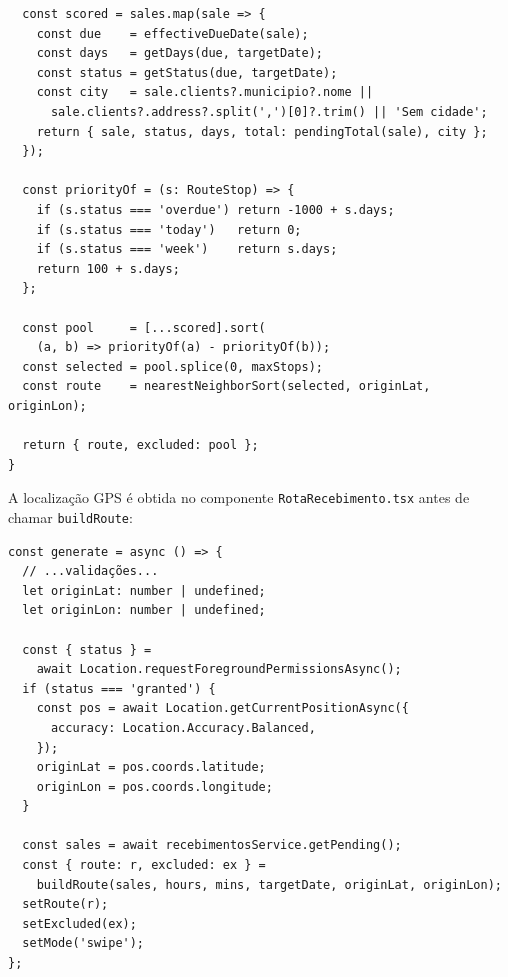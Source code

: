 \documentclass[
	12pt,				%
	oneside,			%
	a4paper,			%
	english,			%
	brazil				%
	]{abntex2}
\begin{document}
\begin{apendicesenv}
\begin{verbatim}
  const scored = sales.map(sale => {
    const due    = effectiveDueDate(sale);
    const days   = getDays(due, targetDate);
    const status = getStatus(due, targetDate);
    const city   = sale.clients?.municipio?.nome ||
      sale.clients?.address?.split(',')[0]?.trim() || 'Sem cidade';
    return { sale, status, days, total: pendingTotal(sale), city };
  });

  const priorityOf = (s: RouteStop) => {
    if (s.status === 'overdue') return -1000 + s.days;
    if (s.status === 'today')   return 0;
    if (s.status === 'week')    return s.days;
    return 100 + s.days;
  };

  const pool     = [...scored].sort(
    (a, b) => priorityOf(a) - priorityOf(b));
  const selected = pool.splice(0, maxStops);
  const route    = nearestNeighborSort(selected, originLat, originLon);

  return { route, excluded: pool };
}
\end{verbatim}

A localização GPS é obtida no componente \texttt{RotaRecebimento.tsx} antes de chamar \texttt{buildRoute}:

\begin{verbatim}
const generate = async () => {
  // ...validações...
  let originLat: number | undefined;
  let originLon: number | undefined;

  const { status } =
    await Location.requestForegroundPermissionsAsync();
  if (status === 'granted') {
    const pos = await Location.getCurrentPositionAsync({
      accuracy: Location.Accuracy.Balanced,
    });
    originLat = pos.coords.latitude;
    originLon = pos.coords.longitude;
  }

  const sales = await recebimentosService.getPending();
  const { route: r, excluded: ex } =
    buildRoute(sales, hours, mins, targetDate, originLat, originLon);
  setRoute(r);
  setExcluded(ex);
  setMode('swipe');
};
\end{verbatim}

\end{apendicesenv}

\end{document}
